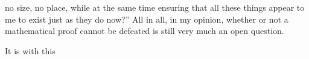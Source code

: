 \documentclass{mathbook}
\begin{document}
no size, no place, while at the same time ensuring that all these things appear to me to exist just as they do now?'' All in all, in my opinion, whether or not a mathematical proof cannot be defeated is still very much an open question.

    It is with this 
    \newpage
    
    
\end{document}
